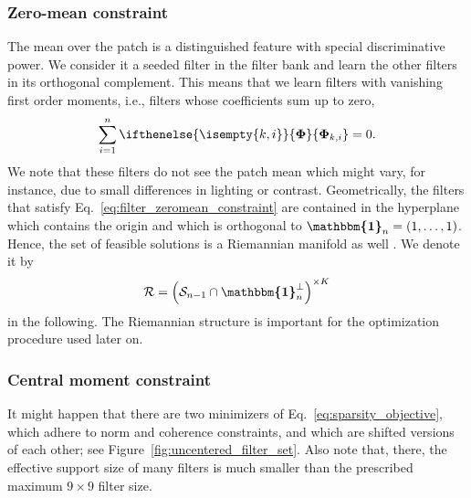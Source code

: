 \documentclass[journal]{IEEEtran}
\newcommand{\ones}{\bm{\mathbbm{1}}}
\newcommand{\AOF}[1]{\ifthenelse{\isempty{#1}}{\boldsymbol{\Phi}}{\boldsymbol{\Phi}_{#1}}}
\begin{document}
\subsubsection{Zero-mean constraint}

The mean over the patch is a distinguished feature with special discriminative power.
We consider it a seeded filter in the filter bank and learn the other filters in its orthogonal complement. This means that we learn filters with vanishing first order moments,
i.e., filters whose coefficients sum up to zero, 
\begin{equation} \label{eq:filter_zeromean_constraint}
\sum_{i=1}^n \AOF{k,i} = 0.
\end{equation}
We note that these filters do not see the patch mean
which might vary, for instance, due to small differences in lighting or contrast.
Geometrically, the filters that satisfy Eq.~\eqref{eq:filter_zeromean_constraint}
are contained in the hyperplane which contains the origin and which is orthogonal to 
 $\ones_n = (1,\ldots,1)$. 
Hence,  the set of feasible solutions is a Riemannian manifold as well \cite{kiechle2015}. We denote it by
\begin{equation}
\label{eq:DefManifold}
\mathcal{R} = \left( \mathcal{S}_{n-1} \cap \ones_n^{\perp} \right)^{\times K}
\end{equation}
in the following. The Riemannian structure is important for the optimization procedure used later on.

\subsubsection{Central moment constraint}

It might happen that there are two minimizers of  Eq.~\eqref{eq:sparsity_objective}, which adhere to norm and coherence constraints, and which are shifted versions of each other;
see Figure~\ref{fig:uncentered_filter_set}.
Also note that, there, the effective support size of many filters is much smaller than the prescribed maximum $9 \times 9$ filter size.
\end{document}
